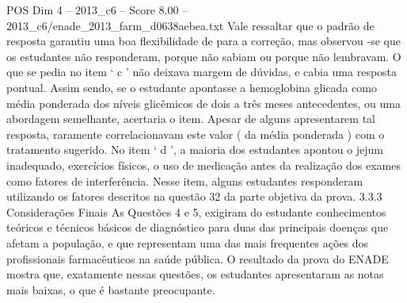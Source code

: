 \begin{textsample}{POS Dim 4 – 2013\_c6 – Score 8.00 – 2013\_c6/enade\_2013\_farm\_d0638aebea.txt}
Vale ressaltar que o padrão de resposta garantiu uma boa flexibilidade de para a correção, mas observou -se que os estudantes não responderam, porque não sabiam ou porque não lembravam.
O que se pedia no item ‘ c ’ não deixava margem de dúvidas, e cabia uma resposta pontual.
Assim sendo, se o estudante apontasse a hemoglobina glicada como média ponderada dos níveis glicêmicos de dois a três meses antecedentes, ou uma abordagem semelhante, acertaria o item.
Apesar de alguns apresentarem tal resposta, raramente correlacionavam este valor ( da média ponderada ) com o tratamento sugerido.
No item ‘ d ’, a maioria dos estudantes apontou o jejum inadequado, exercícios físicos, o uso de medicação antes da realização dos exames como fatores de interferência.
Nesse item, alguns estudantes responderam utilizando os fatores descritos na questão 32 da parte objetiva da prova. 3.3.3 Considerações Finais As Questões 4 e 5, exigiram do estudante conhecimentos teóricos e técnicos básicos de diagnóstico para duas das principais doenças que afetam a população, e que representam uma das mais frequentes ações dos profissionais farmacêuticos na saúde pública.
O resultado da prova do ENADE mostra que, exatamente nessas questões, os estudantes apresentaram as notas mais baixas, o que é bastante preocupante.

\end{textsample}
